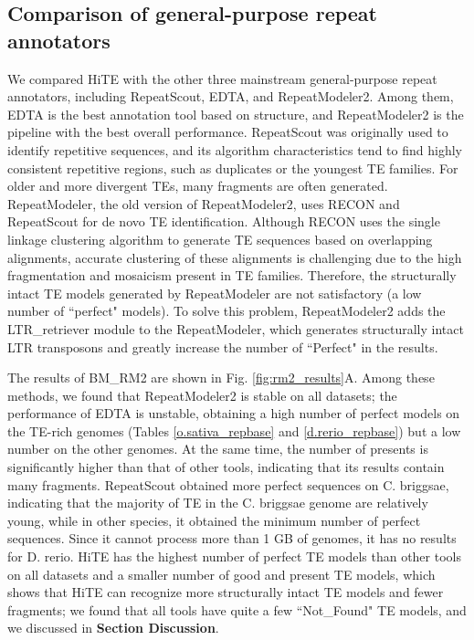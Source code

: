 \documentclass{bmcart}
\begin{document}


\subsection*{Comparison of general-purpose repeat annotators}
We compared HiTE with the other three mainstream general-purpose repeat annotators, including RepeatScout, EDTA, and RepeatModeler2. Among them, EDTA is the best annotation tool based on structure, and RepeatModeler2 is the pipeline with the best overall performance. RepeatScout was originally used to identify repetitive sequences, and its algorithm characteristics tend to find highly consistent repetitive regions, such as duplicates or the youngest TE families. For older and more divergent TEs, many fragments are often generated. RepeatModeler, the old version of RepeatModeler2, uses RECON and RepeatScout for de novo TE identification. Although RECON uses the single linkage clustering algorithm to generate TE sequences based on overlapping alignments, accurate clustering of these alignments is challenging due to the high fragmentation and mosaicism present in TE families\cite{storer2022methodologies}. Therefore, the structurally intact TE models generated by RepeatModeler are not satisfactory (a low number of ``perfect" models). To solve this problem, RepeatModeler2 adds the LTR\_retriever module to the RepeatModeler, which generates structurally intact LTR transposons and greatly increase the number of ``Perfect" in the results\cite{flynn2020repeatmodeler2}.

The results of BM\_RM2 are shown in Fig. \ref{fig:rm2_results}A. Among these methods, we found that RepeatModeler2 is stable on all datasets; the performance of EDTA is unstable, obtaining a high number of perfect models on the TE-rich genomes (Tables \ref{o.sativa_repbase} and \ref{d.rerio_repbase}) but a low number on the other genomes. At the same time, the number of presents is significantly higher than that of other tools, indicating that its results contain many fragments. RepeatScout obtained more perfect sequences on C. briggsae, indicating that the majority of TE in the C. briggsae genome are relatively young, while in other species, it obtained the minimum number of perfect sequences. Since it cannot process more than 1 GB of genomes, it has no results for D. rerio. HiTE has the highest number of perfect TE models than other tools on all datasets and a smaller number of good and present TE models, which shows that HiTE can recognize more structurally intact TE models and fewer fragments; we found that all tools have quite a few ``Not\_Found" TE models, and we discussed in \textbf{Section Discussion}.
\end{document}
